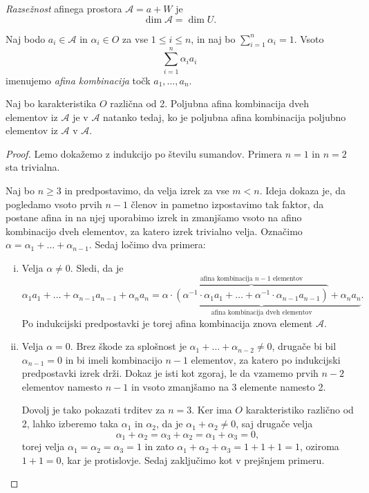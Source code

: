 \begin{definicija}
    \emph{Razsežnost} afinega prostora $\mathcal{A} = a + W$ je 
    \[
    \dim \mathcal{A} = \dim U.
    \]
\end{definicija}

\begin{definicija}
    Naj bodo $a_{i} \in \mathcal{A}$ in $\alpha_{i} \in O$ za vse $1 \leq i \leq n$, in naj bo $\sum_{i=1}^{n} \alpha_{i} = 1$. Vsoto 
    \[
    \sum_{i=1}^{n} \alpha_{i} a_{i}
    \]
    imenujemo \emph{afina kombinacija} točk $a_1,\dots, a_n$.
\end{definicija}

\begin{lema}
    Naj bo karakteristika $O$ različna od 2. Poljubna afina kombinacija dveh elementov iz $\mathcal{A}$ je v $\mathcal{A}$ natanko tedaj, ko je poljubna afina kombinacija poljubno elementov iz $\mathcal{A}$ v $\mathcal{A}$.
\end{lema}

\begin{proof}
    Lemo dokažemo z indukcijo po številu sumandov. Primera $n = 1$ in $n = 2$ sta trivialna.
    
    Naj bo $n \geq 3$ in predpostavimo, da velja izrek za vse $m < n$. Ideja dokaza je, da pogledamo vsoto prvih $n - 1$ členov in pametno izpostavimo tak faktor, da postane afina in na njej uporabimo izrek
    in zmanjšamo vsoto na afino kombinacijo dveh elementov, za katero izrek trivialno velja.
    Označimo $\alpha = \alpha_1 + \dots + \alpha_{n-1}$. Sedaj ločimo dva primera:
   
    \begin{enumerate}[i)]
    \item Velja $\alpha \neq 0.$ Sledi, da je
    \[
        \alpha_1 a_1 + \dots + \alpha_{n-1} a_{n-1} + \alpha_n a_n = 
        \underbrace{\alpha \cdot \overbrace{(\alpha^{-1} \cdot \alpha_1 a_1 + \dots + \alpha^{-1} \cdot \alpha_{n-1} a_{n-1})}^{\text{afina kombinacija $n - 1$ elementov}} + \alpha_n a_n}_{\text{afina kombinacija dveh elementov}}.
    \]
    Po indukcijski predpostavki je torej afina kombinacija znova element $\mathcal{A}$.
    \item Velja $\alpha = 0$.
    Brez škode za splošnost je $\alpha_1 + \dots + \alpha_{n-2} \neq 0$, drugače bi bil $\alpha_{n-1} = 0$ in bi imeli kombinacijo $n-1$ elementov, za katero po indukcijski predpostavki izrek drži.
    Dokaz je isti kot zgoraj, le da vzamemo prvih $n-2$ elementov namesto $n-1$ in vsoto zmanjšamo na 3 elemente namesto 2. 
    
    Dovolj je tako pokazati trditev za $n=3$. Ker ima $O$ karakteristiko različno od 2, lahko izberemo taka $\alpha_1$ in $\alpha_2$, da je $\alpha_1 + \alpha_2 \neq 0$,
    saj drugače velja
    \[
    \alpha_1 + \alpha_2 = \alpha_3 + \alpha_2 = \alpha_1 + \alpha_3 = 0,
    \]
    torej velja $\alpha_1 = \alpha_2 = \alpha_3 = 1$ in zato $\alpha_1 + \alpha_2 + \alpha_3 = 1 + 1 + 1 = 1$, oziroma $1 + 1 = 0$, kar je protislovje. Sedaj zaključimo kot v prejšnjem primeru. \qedhere
    \end{enumerate}
\end{proof}

